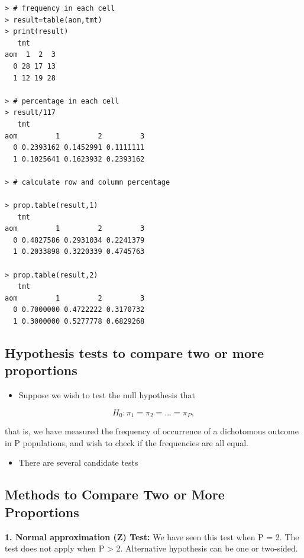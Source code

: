 \documentclass[
]{book}
\providecommand{\tightlist}{%
  \setlength{\itemsep}{0pt}\setlength{\parskip}{0pt}}
\begin{document}
\begin{verbatim}
> # frequency in each cell
> result=table(aom,tmt)
> print(result)
   tmt
aom  1  2  3
  0 28 17 13
  1 12 19 28
 
> # percentage in each cell
> result/117
   tmt
aom         1         2         3
  0 0.2393162 0.1452991 0.1111111
  1 0.1025641 0.1623932 0.2393162

> # calculate row and column percentage

> prop.table(result,1)
   tmt
aom         1         2         3
  0 0.4827586 0.2931034 0.2241379
  1 0.2033898 0.3220339 0.4745763

> prop.table(result,2)
   tmt
aom         1         2         3
  0 0.7000000 0.4722222 0.3170732
  1 0.3000000 0.5277778 0.6829268
\end{verbatim}

\hypertarget{hypothesis-tests-to-compare-two-or-more-proportions}{%
\subsection{Hypothesis tests to compare two or more proportions}\label{hypothesis-tests-to-compare-two-or-more-proportions}}

\begin{itemize}
\tightlist
\item
  Suppose we wish to test the null hypothesis that
\end{itemize}

\[H_0:\pi_1=\pi_2=...=\pi_P,\]

that is, we have measured the frequency of occurrence of a dichotomous outcome in P populations, and wish to check if the frequencies are all equal.

\begin{itemize}
\tightlist
\item
  There are several candidate tests
\end{itemize}

\hypertarget{methods-to-compare-two-or-more-proportions}{%
\subsection{Methods to Compare Two or More Proportions}\label{methods-to-compare-two-or-more-proportions}}

\textbf{1. Normal approximation (Z) Test:} We have seen this test when P = 2. The test does not apply when P \textgreater{} 2. Alternative hypothesis can be one or two-sided.
\end{document}
